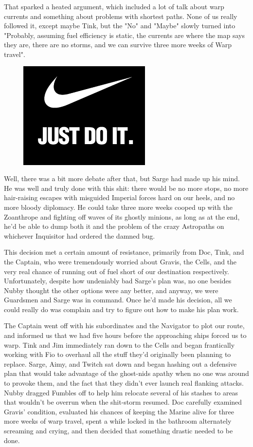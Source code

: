 That sparked a heated argument, which included a lot of talk about warp currents and something about problems with shortest paths. 
None of us really followed it, except maybe Tink, but the "No" and "Maybe" slowly turned into "Probably, assuming fuel efficiency is static, the currents are where the map says they are, there are no storms, and we can survive three more weeks of Warp travel".

\begin{figure}
	\begin{center}
		\includegraphics[width=\figwidth]{pics/15/31.png}
	\end{center}
\end{figure}
Well, there was a bit more debate after that, but Sarge had made up his mind. 
He was well and truly done with this shit: 
there would be no more stops, no more hair-raising escapes with misguided Imperial forces hard on our heels, and no more bloody diplomacy. 
He could take three more weeks cooped up with the Zoanthrope and fighting off waves of its ghostly minions, as long as at the end, he'd be able to dump both it and the problem of the crazy Astropaths on whichever Inquisitor had ordered the damned bug.

This decision met a certain amount of resistance, primarily from Doc, Tink, and the Captain, who were tremendously worried about Gravis, the Cells, and the very real chance of running out of fuel short of our destination respectively. 
Unfortunately, despite how undeniably bad Sarge's plan was, no one besides Nubby thought the other options were any better, and anyway, we were Guardsmen and Sarge was in command. 
Once he'd made his decision, all we could really do was complain and try to figure out how to make his plan work.

The Captain went off with his subordinates and the Navigator to plot our route, and informed us that we had five hours before the approaching ships forced us to warp. 
Tink and Jim immediately ran down to the Cells and began frantically working with Fio to overhaul all the stuff they'd originally been planning to replace. 
Sarge, Aimy, and Twitch sat down and began hashing out a defensive plan that would take advantage of the ghost-nids apathy when no one was around to provoke them, and the fact that they didn't ever launch real flanking attacks. 
Nubby dragged Fumbles off to help him relocate several of his stashes to areas that wouldn't be overrun when the shit-storm resumed. 
Doc carefully examined Gravis' condition, evaluated his chances of keeping the Marine alive for three more weeks of warp travel, spent a while locked in the bathroom alternately screaming and crying, and then decided that something drastic needed to be done.

